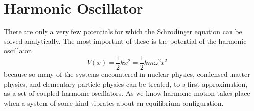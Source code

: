 













































\section{Harmonic Oscillator}
There are only a very few potentials for which the Schrodinger equation can be solved analytically. The most important of these is the potential of the harmonic oscillator.
$$
V(x)=\frac{1}{2} kx^{2}=\frac{1}{2} km\omega^{2}x^{2}
$$
because so many of the systems encountered in nuclear physics, condensed matter physics, and elementary particle physics can be treated, to a first approximation, as a set of coupled harmonic oscillators. As we know harmonic motion takes place when a system of some kind vibrates about an equilibrium configuration.
